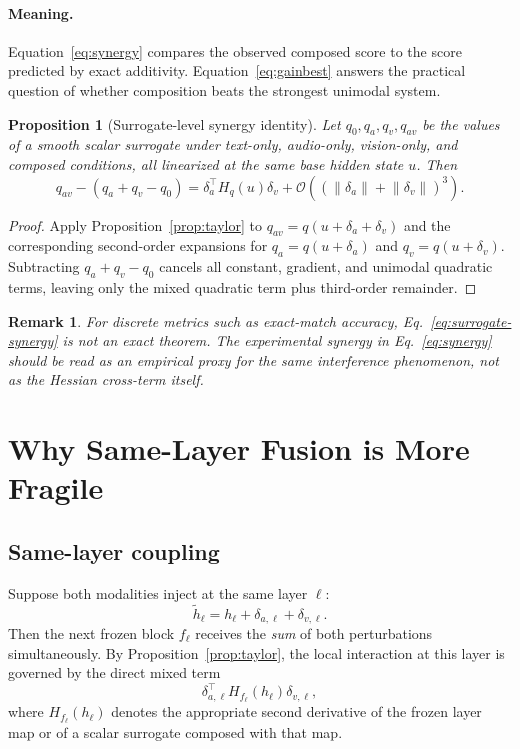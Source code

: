 \documentclass[11pt]{article}
\newcommand{\norm}[1]{\left\lVert #1 \right\rVert}
\newcommand{\bigO}{\mathcal{O}}
\newtheorem{proposition}{Proposition}
\newtheorem{remark}{Remark}
\begin{document}
\paragraph{Meaning.}
Equation~\eqref{eq:synergy} compares the observed composed score to the score
predicted by exact additivity. Equation~\eqref{eq:gainbest} answers the
practical question of whether composition beats the strongest unimodal system.

\begin{proposition}[Surrogate-level synergy identity]
\label{prop:synergy}
Let $q_0, q_a, q_v, q_{av}$ be the values of a smooth scalar surrogate under
text-only, audio-only, vision-only, and composed conditions, all linearized at
the same base hidden state $u$. Then
\begin{equation}
q_{av} - (q_a + q_v - q_0)
=
\delta_a^\top H_q(u)\delta_v
+ \bigO\!\left((\norm{\delta_a}+\norm{\delta_v})^3\right).
\label{eq:surrogate-synergy}
\end{equation}
\end{proposition}

\begin{proof}
Apply Proposition~\ref{prop:taylor} to $q_{av} = q(u+\delta_a+\delta_v)$ and
the corresponding second-order expansions for $q_a = q(u+\delta_a)$ and
$q_v = q(u+\delta_v)$. Subtracting $q_a + q_v - q_0$ cancels all constant,
gradient, and unimodal quadratic terms, leaving only the mixed quadratic term
plus third-order remainder.
\end{proof}

\begin{remark}
For discrete metrics such as exact-match accuracy, Eq.~\eqref{eq:surrogate-synergy}
is not an exact theorem. The experimental synergy in Eq.~\eqref{eq:synergy}
should be read as an empirical proxy for the same interference phenomenon, not
as the Hessian cross-term itself.
\end{remark}

\section{Why Same-Layer Fusion is More Fragile}

\subsection{Same-layer coupling}

Suppose both modalities inject at the same layer $\ell$:
\[
\tilde h_\ell = h_\ell + \delta_{a,\ell} + \delta_{v,\ell}.
\]
Then the next frozen block $f_\ell$ receives the \emph{sum} of both
perturbations simultaneously. By Proposition~\ref{prop:taylor}, the local
interaction at this layer is governed by the direct mixed term
\[
\delta_{a,\ell}^\top H_{f_\ell}(h_\ell)\delta_{v,\ell},
\]
where $H_{f_\ell}(h_\ell)$ denotes the appropriate second derivative of the
frozen layer map or of a scalar surrogate composed with that map.
\end{document}
